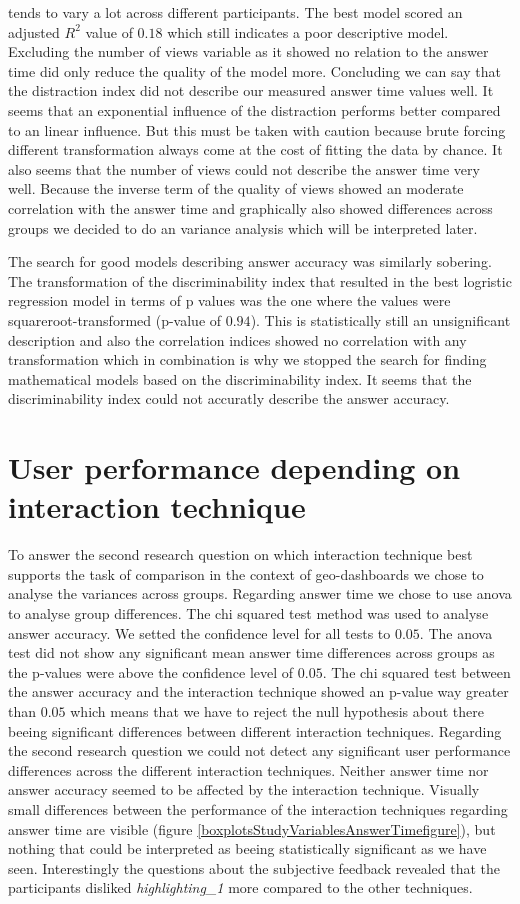 tends to vary a lot across different participants. The best model scored an adjusted $R^2$ value of $0.18$ which still indicates a poor descriptive model. Excluding
the number of views variable as it showed no relation to the answer time did only reduce the quality of the model more. Concluding we can say that the distraction index
did not describe our measured answer time values well. It seems that an exponential influence of the distraction performs better compared to an linear influence.
But this must be taken with caution because brute forcing different transformation always come at the cost of fitting the data by chance. It also seems that the number of views
could not describe the answer time very well. Because the inverse term of the quality of views showed an moderate correlation with the answer time and graphically also showed
differences across groups we decided to do an variance analysis which will be interpreted later.

The search for good models describing answer accuracy was similarly sobering. The transformation of the discriminability index that resulted in
the best logristic regression model in terms of p values was the one where the values were squareroot-transformed (p-value of $0.94$). This is 
statistically still an unsignificant description and also the correlation indices showed no correlation with any transformation which in combination is
why we stopped the search for finding mathematical models based on the discriminability index. It seems that the discriminability index could not
accuratly describe the answer accuracy.
\section{User performance depending on interaction technique}
To answer the second research question on which interaction technique best supports the task of comparison in the context of geo-dashboards we chose to analyse the variances
across groups. Regarding answer time we chose to use anova to analyse group differences. The chi squared test method was used to analyse answer accuracy.
We setted the confidence level for all tests to $0.05$. The anova test did not show any significant mean answer time differences across groups as the p-values were above
the confidence level of $0.05$. The chi squared test between the
answer accuracy and the interaction technique showed an p-value way greater than $0.05$ which means that we have to reject the null hypothesis about there beeing significant differences
between different interaction techniques. Regarding the second research question we could not detect any significant user performance differences across the different interaction techniques.
Neither answer time nor answer accuracy seemed to be affected by the interaction technique. Visually small differences between the performance of the interaction techniques regarding answer time
are visible (figure \ref{boxplotsStudyVariablesAnswerTimefigure}), but nothing that could be interpreted as beeing statistically significant as we have seen. Interestingly
the questions about the subjective feedback revealed that the participants disliked \textit{highlighting\_1} more compared to the other techniques.

